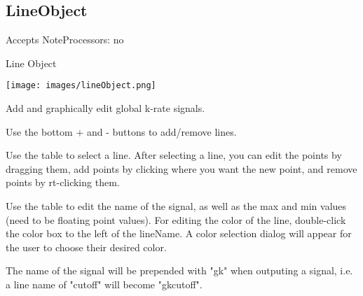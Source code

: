 \subsection{LineObject}\label{lineObject}

Accepts NoteProcessors: no

Line Object

\texttt{[image: images/lineObject.png]}

Add and graphically edit global k-rate signals.

Use the bottom + and - buttons to add/remove lines.

Use the table to select a line. After selecting a line, you can edit the
points by dragging them, add points by clicking where you want the new
point, and remove points by rt-clicking them.

Use the table to edit the name of the signal, as well as the max and min
values (need to be floating point values). For editing the color of the
line, double-click the color box to the left of the lineName. A color
selection dialog will appear for the user to choose their desired color.

The name of the signal will be prepended with "gk" when outputing a
signal, i.e. a line name of "cutoff" will become "gkcutoff".
